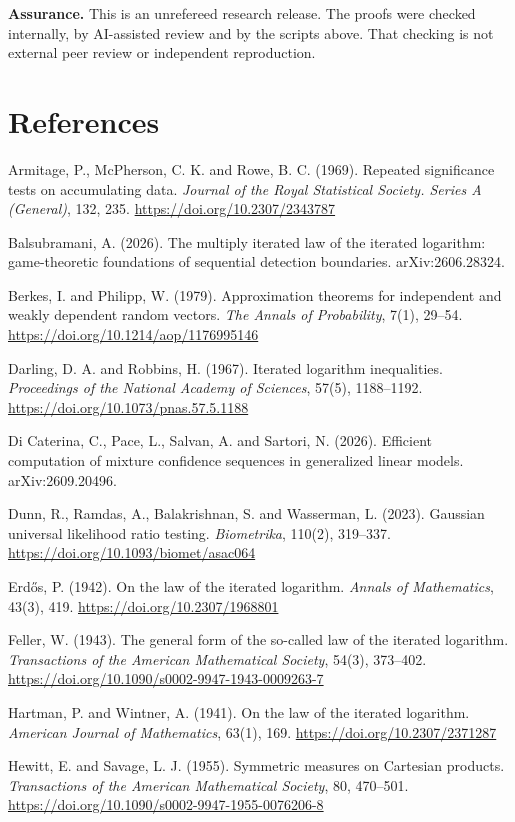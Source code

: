 \documentclass[
  10pt,
  a4paper,
]{article}
\begin{document}
\textbf{Assurance.} This is an unrefereed research release. The proofs
were checked internally, by AI-assisted review and by the scripts above.
That checking is not external peer review or independent reproduction.

\section{References}\label{references}

Armitage, P., McPherson, C. K. and Rowe, B. C. (1969). Repeated
significance tests on accumulating data. \emph{Journal of the Royal
Statistical Society. Series A (General)}, 132, 235.
\url{https://doi.org/10.2307/2343787}

Balsubramani, A. (2026). The multiply iterated law of the iterated
logarithm: game-theoretic foundations of sequential detection
boundaries. arXiv:2606.28324.

Berkes, I. and Philipp, W. (1979). Approximation theorems for
independent and weakly dependent random vectors. \emph{The Annals of
Probability}, 7(1), 29--54. \url{https://doi.org/10.1214/aop/1176995146}

Darling, D. A. and Robbins, H. (1967). Iterated logarithm inequalities.
\emph{Proceedings of the National Academy of Sciences}, 57(5),
1188--1192. \url{https://doi.org/10.1073/pnas.57.5.1188}

Di Caterina, C., Pace, L., Salvan, A. and Sartori, N. (2026). Efficient
computation of mixture confidence sequences in generalized linear
models. arXiv:2609.20496.

Dunn, R., Ramdas, A., Balakrishnan, S. and Wasserman, L. (2023).
Gaussian universal likelihood ratio testing. \emph{Biometrika}, 110(2),
319--337. \url{https://doi.org/10.1093/biomet/asac064}

Erdős, P. (1942). On the law of the iterated logarithm. \emph{Annals of
Mathematics}, 43(3), 419. \url{https://doi.org/10.2307/1968801}

Feller, W. (1943). The general form of the so-called law of the iterated
logarithm. \emph{Transactions of the American Mathematical Society},
54(3), 373--402. \url{https://doi.org/10.1090/s0002-9947-1943-0009263-7}

Hartman, P. and Wintner, A. (1941). On the law of the iterated
logarithm. \emph{American Journal of Mathematics}, 63(1), 169.
\url{https://doi.org/10.2307/2371287}

Hewitt, E. and Savage, L. J. (1955). Symmetric measures on Cartesian
products. \emph{Transactions of the American Mathematical Society}, 80,
470--501. \url{https://doi.org/10.1090/s0002-9947-1955-0076206-8}
\end{document}
